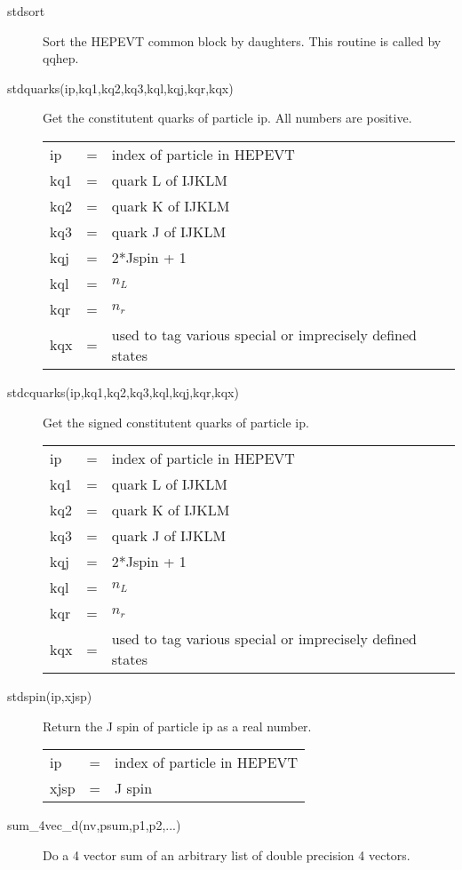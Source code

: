 \begin{description}
\item[stdsort]
 Sort the HEPEVT common block by daughters. 
 This routine is called by qqhep.

\item[stdquarks(ip,kq1,kq2,kq3,kql,kqj,kqr,kqx)]
 Get the constitutent quarks of particle ip.
 All numbers are positive.

\begin{tabular}{lcl}
ip  & = & index of particle in HEPEVT \\
kq1 & = &  quark L of IJKLM \\
kq2 & = &  quark K of IJKLM \\
kq3 & = &  quark J of IJKLM \\
kqj & = &  2*Jspin + 1 \\
kql & = &  $n_L$ \\
kqr & = &  $n_r$ \\
kqx & = &  used to tag various special or imprecisely defined states \\
\end{tabular}

\item[stdcquarks(ip,kq1,kq2,kq3,kql,kqj,kqr,kqx)]
 Get the signed constitutent quarks of particle ip.

\begin{tabular}{lcl}
ip  & = & index of particle in HEPEVT \\
kq1 & = &  quark L of IJKLM \\
kq2 & = &  quark K of IJKLM \\
kq3 & = &  quark J of IJKLM \\
kqj & = &  2*Jspin + 1 \\
kql & = &  $n_L$ \\
kqr & = &  $n_r$ \\
kqx & = &  used to tag various special or imprecisely defined states \\
\end{tabular}

\item[stdspin(ip,xjsp)] 
 Return the J spin of particle ip as a real number.

\begin{tabular}{lcl}
ip   & = & index of particle in HEPEVT \\
xjsp & = & J spin \\
\end{tabular}

\item[sum\_4vec\_d(nv,psum,p1,p2,...)] 
 Do a 4 vector sum of an arbitrary list of double precision 4 vectors.


\end{description}
